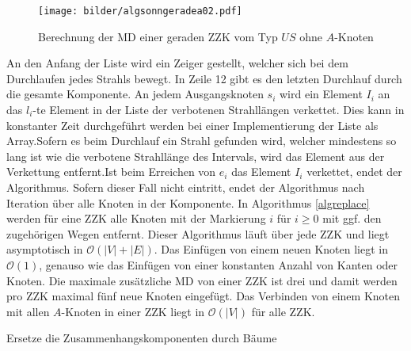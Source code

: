 \vspace{-2mm}
\begin{figure}[h!]
\centering
\texttt{[image: bilder/algsonngeradea02.pdf]}
\caption{Berechnung der MD einer geraden ZZK vom Typ $US$ ohne $A$-Knoten}
\label{bild:algUSG0}
\end{figure}
\vspace{-3mm}
An den Anfang der Liste wird ein Zeiger gestellt, welcher sich bei dem Durchlaufen jedes Strahls bewegt. In Zeile 12 gibt es den letzten Durchlauf durch die gesamte Komponente. An jedem Ausgangsknoten $s_i$ wird ein Element $I_i$ an das $l_i$-te Element in der Liste der verbotenen Strahllängen verkettet. Dies kann in konstanter Zeit durchgeführt werden bei einer Implementierung der Liste als Array.\newline Sofern es beim Durchlauf ein Strahl gefunden wird, welcher mindestens so lang ist wie die verbotene Strahllänge des Intervals, wird das Element aus der Verkettung entfernt.\newline Ist beim Erreichen von $e_i$ das Element $I_i$ verkettet, endet der Algorithmus. Sofern dieser Fall nicht eintritt, endet der Algorithmus nach Iteration über alle Knoten in der Komponente.\newline\newline
In Algorithmus \ref{algreplace} werden für eine ZZK alle Knoten mit der Markierung $i$ für $i \geq 0$ mit ggf. den zugehörigen Wegen entfernt. Dieser Algorithmus läuft über jede ZZK und liegt asymptotisch in $\mathcal{O}(|V|+|E|)$.
Das Einfügen von einem neuen Knoten liegt in $\mathcal{O}(1)$, genauso wie das Einfügen von einer konstanten Anzahl von Kanten oder Knoten. Die maximale zusätzliche MD von einer ZZK ist drei und damit werden pro ZZK maximal fünf neue Knoten eingefügt. Das Verbinden von einem Knoten mit allen $A$-Knoten in einer ZZK liegt in $\mathcal{O}(|V|)$ für alle ZZK.\\
\vspace{-3mm}
\begin{algorithm}
\caption{Ersetze die Zusammenhangskomponenten durch Bäume}
\begin{algorithmic}[1]
\vspace{2mm}
\ENDFOR
\vspace{2mm}
\end{algorithmic}
\label{algreplace}
\end{algorithm}

